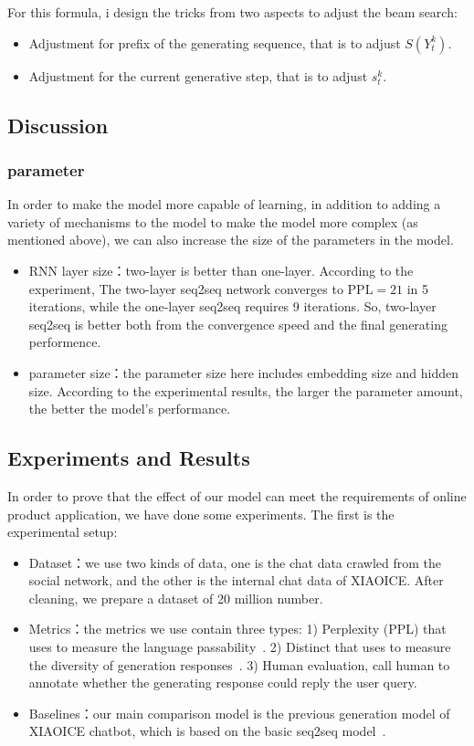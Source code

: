 \documentclass[12pt,a4paper]{article}
\begin{document}
For this formula, i design the tricks from two aspects to adjust the beam search:
\begin{itemize}
  \item Adjustment for prefix of the generating sequence, that is to adjust $S(Y_t^k)$.
  \item Adjustment for the current generative step, that is to adjust $s_t^k$.
\end{itemize}




\subsection{Discussion}
\subsubsection{parameter}
In order to make the model more capable of learning, in addition to adding a variety of mechanisms to the model to make the model more complex (as mentioned above), we can also increase the size of the parameters in the model.

\begin{itemize}
  \item RNN layer size：two-layer is better than one-layer. According to the experiment, The two-layer seq2seq network converges to $\mathrm{PPL} = 21$ in 5 iterations, while the one-layer seq2seq requires 9 iterations. So, two-layer seq2seq is better both from the convergence speed and the final generating performence. 
  \item parameter size：the parameter size here includes embedding size and hidden size. According to the experimental results, the larger the parameter amount, the better the model's performance.
\end{itemize}

\subsection{Experiments and Results}
In order to prove that the effect of our model can meet the requirements of online product application, we have done some experiments. The first is the experimental setup:
\begin{itemize}
  \item Dataset：we use two kinds of data, one is the chat data crawled from the social network, and the other is the internal chat data of XIAOICE. After cleaning, we prepare a dataset of 20 million number.
  \item Metrics：the metrics we use contain three types: 1) Perplexity (PPL) that uses to measure the language passability~\cite{DBLP:journals/coling/BrownPPLM92}. 2) Distinct that uses to measure the diversity of generation responses~\cite{DBLP:conf/naacl/LiGBGD16}. 3) Human evaluation, call human to annotate whether the generating response could reply the user query.
  \item Baselines：our main comparison model is the previous generation model of XIAOICE chatbot, which is based on the basic seq2seq model~\cite{DBLP:journals/corr/BahdanauCB14}.
\end{itemize}
\end{document}
